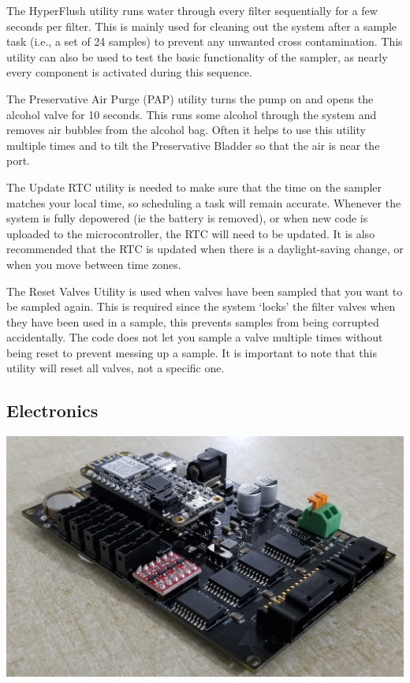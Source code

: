 \documentclass[11pt, letterpaper]{article}
\begin{document}
The HyperFlush utility runs water through every filter sequentially for a few seconds per filter. This is mainly used for cleaning out the system after a sample task (i.e., a set of 24 samples) to prevent any unwanted cross contamination. This utility can also be used to test the basic functionality of the sampler, as nearly every component is activated during this sequence. 
\newline\par
The Preservative Air Purge (PAP) utility turns the pump on and opens the alcohol valve for 10 seconds. This runs some alcohol through the system and removes air bubbles from the alcohol bag. Often it helps to use this utility multiple times and to tilt the Preservative Bladder so that the air is near the port.
\newline\par
The Update RTC utility is needed to make sure that the time on the sampler matches your local time, so scheduling a task will remain accurate. Whenever the system is fully depowered (ie the battery is removed), or when new code is uploaded to the microcontroller, the RTC will need to be updated. It is also recommended that the RTC is updated when there is a daylight-saving change, or when you move between time zones.
\newline\par
The Reset Valves Utility is used when valves have been sampled that you want to be sampled again. This is required since the system ‘locks’ the filter valves when they have been used in a sample, this prevents samples from being corrupted accidentally. The code does not let you sample a valve multiple times without being reset to prevent messing up a sample. It is important to note that this utility will reset all valves, not a specific one.

\subsection{Electronics}
\begin{center}
	\includegraphics[scale=0.15]{./Assets/eDNABoard.jpg}
\end{center}
\end{document}
